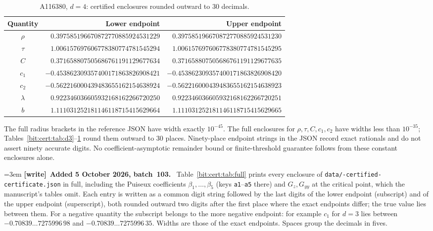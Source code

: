 \documentclass[11pt]{article}
\theoremstyle{definition}\newtheorem{definition}[theorem]{Definition}
\theoremstyle{remark}\newtheorem{remark}[theorem]{Remark}
\newenvironment{writenote}[1][]{\par\smallskip\begingroup\small\emergencystretch=3em
 \noindent\textbf{[write]}\if\relax\detokenize{#1}\relax\else~\textbf{#1.}\fi\ }%
 {\par\endgroup\smallskip}
\begin{document}
\begin{table}[htbp]
\centering\small
\begin{tabular}{c@{\qquad}r@{\quad}r}\toprule
Quantity & Lower endpoint & Upper endpoint\\\midrule
$\rho$ & $0.397585196670872770885924531229$ & $0.397585196670872770885924531230$\\
$\tau$ & $1.006157697606778380774781545294$ & $1.006157697606778380774781545295$\\
$C$ & $0.371658807505686761191129677634$ & $0.371658807505686761191129677635$\\
$c_1$ & $-0.453862309357400171863826908421$ & $-0.453862309357400171863826908420$\\
$c_2$ & $-0.562216000439483655162154638924$ & $-0.562216000439483655162154638923$\\
$\lambda$ & $0.922346036605932168162266720250$ & $0.922346036605932168162266720251$\\
$b$ & $1.111031252181146118715415629664$ & $1.111031252181146118715415629665$\\
\bottomrule\end{tabular}
\caption{A116380, $d=4$: certified enclosures rounded outward to 30 decimals.}
\label{bit:cert:tab:d4}
\end{table}

The full radius brackets in the reference JSON have width exactly $10^{-45}$.
The full enclosures for $\rho,\tau,C,c_1,c_2$ have widths less than
$10^{-35}$; Tables~\ref{bit:cert:tab:d3}--\ref{bit:cert:tab:d4} round them
outward to 30 places. Ninety-place endpoint strings in the JSON record exact
rationals and do not assert ninety accurate digits. No coefficient-asymptotic
remainder bound or finite-threshold guarantee follows from these constant
enclosures alone.

\begin{writenote}[Added 5 October 2026, batch~103]
Table~\ref{bit:cert:tab:full} prints every enclosure of
\texttt{data/-certified-\allowbreak certificate.json} in full,
including the Puiseux coefficients $\beta_1,\ldots,\beta_5$ (keys
\texttt{a1}--\texttt{a5} there) and $G_z,G_{yy}$ at the critical point, which
the manuscript's tables omit. Each entry is written as a common digit string
followed by the last digits of the lower endpoint (subscript) and of the upper
endpoint (superscript), both rounded outward two digits after the first
place where the exact endpoints differ; the true value lies between them. For
a negative quantity the subscript belongs to the more negative endpoint: for
example $c_1$ for $d=3$ lies between $-0.70839\ldots7275996\,98$ and
$-0.70839\ldots7275996\,35$. Widths are those of the exact endpoints. Spaces
group the decimals in fives.
\end{writenote}
\end{document}
